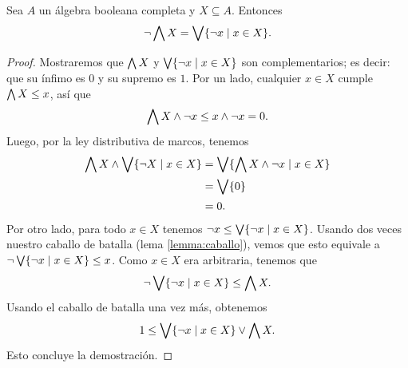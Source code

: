 \begin{lemma}
  Sea $A$ un álgebra booleana completa y $X\subseteq A$.
  Entonces
  \[
    \neg \bigwedge X = \bigvee \{\neg x \mid x\in X\}
  .\]
\end{lemma}
\begin{proof}
  Mostraremos que
  $\bigwedge X$ y $\bigvee \{\neg x \mid x\in X\}$ son complementarios;
  es decir: que su ínfimo es $0$ y su supremo es $1$.
  Por un lado, cualquier $x\in X$ cumple $\bigwedge X\leq x$, así que
  \[
      \bigwedge X\wedge\neg x \leq x\wedge \neg x = 0.
  \]
  Luego, por la ley distributiva de marcos, tenemos
  \begin{align*}
      \bigwedge X \wedge \bigvee\{\neg X\mid x\in X\}
      &= \bigvee\{\bigwedge X \wedge \neg x\mid x\in X\} \\
      &= \bigvee\{0\} \\
      &= 0.
  \end{align*}
  Por otro lado, para todo $x\in X$ tenemos
  $\neg x\leq \bigvee\{\neg x\mid x\in X\}$.
  Usando dos veces nuestro caballo de batalla (lema
  \ref{lemma:caballo}), vemos que esto equivale a
  $\neg\bigvee\{\neg x\mid x\in X\}\leq x$.
  Como $x\in X$ era arbitraria, tenemos que
  \[
      \neg\bigvee\{\neg x\mid x\in X\}\leq \bigwedge X
  .\]
  Usando el caballo de batalla una vez más, obtenemos
  \[
      1\leq \bigvee\{\neg x\mid x\in X\} \vee \bigwedge X
  .\]
  Esto concluye la demostración.
\end{proof}

